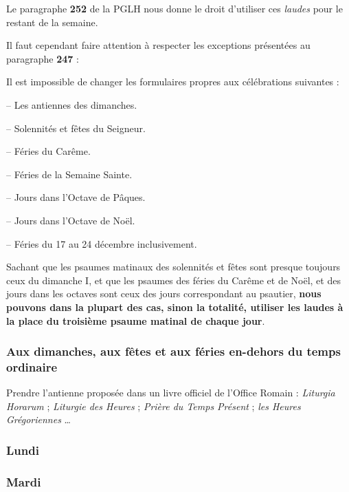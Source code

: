 \documentclass[oneside, 10pt]{article}
\begin{document}
Le paragraphe \textbf{252} de la PGLH nous donne le droit d'utiliser ces \emph{laudes} pour le restant de la semaine.

Il faut cependant faire attention à respecter les exceptions présentées au paragraphe \textbf{247} :

Il est impossible de changer les formulaires propres aux célébrations suivantes :

-- Les antiennes des dimanches.

-- Solennités et fêtes du Seigneur.

-- Féries du Carême.

-- Féries de la Semaine Sainte.

-- Jours dans l'Octave de Pâques.

-- Jours dans l'Octave de Noël.

-- Féries du 17 au 24 décembre inclusivement.

Sachant que les psaumes matinaux des solennités et fêtes sont presque toujours ceux du dimanche I, et que les psaumes des féries du Carême et de Noël, et des jours dans les octaves sont ceux des jours correspondant au psautier, \textbf{nous pouvons dans la plupart des cas, sinon la totalité, utiliser les laudes à la place du troisième psaume matinal de chaque jour}.


\subsubsection*{Aux dimanches, aux fêtes et aux féries en-dehors du temps ordinaire}

Prendre l'antienne proposée dans un livre officiel de l'Office Romain : \textit{Liturgia Horarum} ; \textit{Liturgie des Heures} ; \textit{Prière du Temps Présent} ; \textit{les Heures Grégoriennes} \dots

\subsubsection*{Lundi}

\subsubsection*{Mardi}
\end{document}
